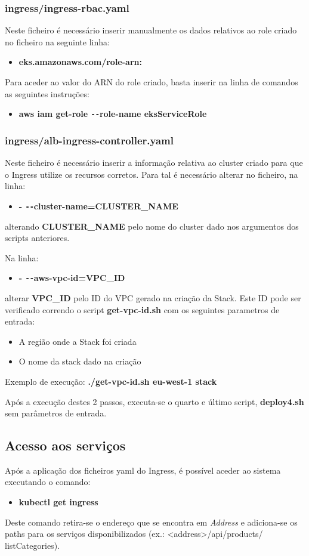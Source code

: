 \documentclass[11pt,a4paper]{article}
\begin{document}
\subsubsection{ingress/ingress-rbac.yaml}
Neste ficheiro é necessário inserir manualmente os dados relativos ao role criado no ficheiro na seguinte linha:
\begin{itemize}
	\item \textbf{eks.amazonaws.com/role-arn:}
\end{itemize}
Para aceder ao valor do ARN do role criado, basta inserir na linha de comandos as seguintes instruções:
\begin{itemize}
	\item \textbf{aws iam get-role \texttt{-{}-}role-name eksServiceRole}
\end{itemize}

\subsubsection{ingress/alb-ingress-controller.yaml}
Neste ficheiro é necessário inserir a informação relativa ao cluster criado para que o Ingress utilize os recursos corretos. Para tal é necessário alterar no ficheiro, na linha: 
\begin{itemize}
	\item \textbf{- \texttt{-{}-}cluster-name=CLUSTER\_NAME}
\end{itemize}
alterando \textbf{CLUSTER\_NAME} pelo nome do cluster dado nos argumentos dos scripts anteriores.

Na linha:
\begin{itemize}
	\item \textbf{- \texttt{-{}-}aws-vpc-id=VPC\_ID}
\end{itemize}
alterar \textbf{VPC\_ID} pelo ID do VPC gerado na criação da Stack. Este ID pode ser verificado correndo o script \textbf{get-vpc-id.sh} com os seguintes parametros de entrada:
\begin{itemize}
	\item A região onde a Stack foi criada
	\item O nome da stack dado na criação
\end{itemize}
Exemplo de execução: \textbf{./get-vpc-id.sh eu-west-1 stack}

Após a execução destes 2 passos, executa-se o quarto e último script, \textbf{deploy4.sh} sem parâmetros de entrada.

\subsection{Acesso aos serviços}
Após a aplicação dos ficheiros yaml do Ingress, é possível aceder ao sistema executando o comando:
\begin{itemize}
	\item \textbf{kubectl get ingress}
\end{itemize}
Deste comando retira-se o endereço que se encontra em \textit{Address} e adiciona-se os paths para os serviços disponibilizados (ex.: <address>/api/products/ listCategories).
\end{document}
